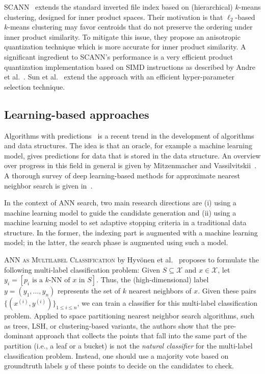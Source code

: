\documentclass[11pt]{article}
\begin{document}
\textsc{\textsc{SCANN}~\cite{DBLP:conf/icml/GuoSLGSCK20}} extends the
standard inverted file index based on (hierarchical) $k$-means
clustering, designed for inner product spaces. Their motivation is that
$\ell_2$-based $k$-means clustering may favor centroids that do not
preserve the ordering under inner product similarity. To mitigate this
issue, they propose an anisotropic quantization technique which is more
accurate for inner product similarity. A significant ingredient to
SCANN's performance is a very efficient product quantization
implementation based on SIMD instructions as described by Andre et
al.~\cite{DBLP:journals/pami/AndreKS21}.
Sun et al.~\cite{DBLP:conf/iclr/SunGK23} extend the approach with an efficient hyper-parameter selection technique.


\subsection{Learning-based approaches}

Algorithms with predictions~\cite{DBLP:conf/sigmod/KraskaBCDP18} is a
recent trend in the development of algorithms and data structures. The idea is that an
oracle, for example a machine learning model, gives predictions for data
that is stored in the data structure. An overview over progress in this
field in general is given by Mitzenmacher and
Vassilvitskii~\cite{DBLP:journals/cacm/MitzenmacherV22}.
A thorough survey of deep learning-based methods for approximate nearest neighbor search is given in~\cite{DBLP:journals/tkde/LiWZWFLW23}.

In the context of ANN search, two main research directions are (i) using a machine learning model to guide the candidate generation and (ii) using a machine learning model to set adaptive stopping criteria in a traditional data structure.
In the former, the indexing part is augmented with a machine learning model; in the latter, the search phase is augmented using such a model.

\textsc{ANN as Multilabel Classification} by Hyvönen et
al.~\cite{DBLP:conf/nips/HyvonenJR22} proposes to formulate the following
multi-label classification problem: Given $S \subseteq \mathcal{X}$ and
$x \in \mathcal{X}$, let $y_i = [p_i \text{ is a $k$-NN of $x$ in $S$}]$.
Thus, the (high-dimensional) label $y = (y_1, \ldots, y_n)$ represents
the set of $k$ nearest neighbors of $x$. Given these pairs $\{(x^{(i)},
	y^{(i)})\}_{1 \leq i \leq n}$, we can train a classifier for this
multi-label classification problem. Applied to space partitioning nearest
neighbor search algorithms, such as trees, LSH, or clustering-based
variants, the authors show that the pre-dominant approach that collects the
points that fall into the same part of the partition (i.e., a leaf or a
bucket) is not the \emph{natural classifier} for the multi-label
classification problem. Instead, one should use a majority vote based on
groundtruth labels $y$ of these points to decide on the candidates to
check.
\end{document}
